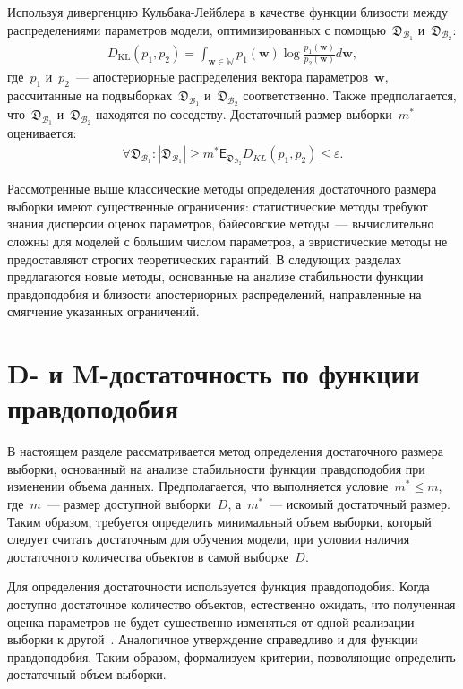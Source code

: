 Используя дивергенцию Кульбака-Лейблера в качестве функции близости между распределениями параметров модели, оптимизированных с помощью~$\mathfrak{D}_{\mathcal{B}_1}$ и~$\mathfrak{D}_{\mathcal{B}_2}$:
\[
\label{eq:bs:9}
\begin{aligned}
	D_\text{KL}\left(p_1, p_2\right) = \int_{\textbf{w}\in\mathbb{W}}p_1(\textbf{w})\log\frac{p_1(\textbf{w})}{p_2(\textbf{w})}d\textbf{w},
\end{aligned}
\]
где~$p_1$ и~$p_2$~--- апостериорные распределения вектора параметров~$\textbf{w}$, рассчитанные на подвыборках~$\mathfrak{D}_{\mathcal{B}_1}$ и~$\mathfrak{D}_{\mathcal{B}_2}$ соответственно. Также предполагается, что~$\mathfrak{D}_{\mathcal{B}_1}$ и~$\mathfrak{D}_{\mathcal{B}_2}$ находятся по соседству.
Достаточный размер выборки~$m^*$ оценивается:
\[
\label{eq:bs:10}
\begin{aligned}
	\forall \mathfrak{D}_{\mathcal{B}_1}: \left|\mathfrak{D}_{\mathcal{B}_1}\right| \geq m^*    \mathsf{E}_{\mathfrak{D}_{\mathcal{B}_2}}D_{KL}\left(p_1, p_2\right) \leq \varepsilon.
\end{aligned}
\]

Рассмотренные выше классические методы определения достаточного размера выборки имеют существенные ограничения: статистические методы требуют знания дисперсии оценок параметров, байесовские методы~--- вычислительно сложны для моделей с большим числом параметров, а эвристические методы не предоставляют строгих теоретических гарантий. В следующих разделах предлагаются новые методы, основанные на анализе стабильности функции правдоподобия и близости апостериорных распределений, направленные на смягчение указанных ограничений.

\section{D- и M-достаточность по функции правдоподобия}

В настоящем разделе рассматривается метод определения достаточного размера выборки, основанный на анализе стабильности функции правдоподобия при изменении объема данных. Предполагается, что выполняется условие~$m^* \leqslant m$, где~$m$~--- размер доступной выборки~$D$, а~$m^*$~--- искомый достаточный размер. Таким образом, требуется определить минимальный объем выборки, который следует считать достаточным для обучения модели, при условии наличия достаточного количества объектов в самой выборке~$D$.

Для определения достаточности используется функция правдоподобия. Когда доступно достаточное количество объектов, естественно ожидать, что полученная оценка параметров не будет существенно изменяться от одной реализации выборки к другой~\cite{joseph1997,joseph1995}. Аналогичное утверждение справедливо и для функции правдоподобия. Таким образом, формализуем критерии, позволяющие определить достаточный объем выборки.

